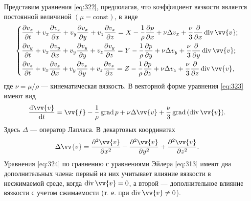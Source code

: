 	Представим уравнения \eqref{eq:322}, предполагая, что коэффициент вязкости является постоянной величиной $\left(\mu = \mathrm{const}\right)$, в виде
	\begin{gather}
		\begin{dcases}\label{eq:323}
			\begin{aligned}
				\frac{\pp v_x}{\pp t} + v_x\frac{\pp v_x}{\pp x} + v_y\frac{\pp v_x}{\pp y} + v_z\frac{\pp v_x}{\pp z} = X - \frac{1}{\rho}\frac{\pp p}{\pp x} + \nu\Delta v_x + \frac{\nu}{3}\frac{\pp}{\pp x}\diverg\vv{v};
			\end{aligned}\\
			\begin{aligned}
				\frac{\pp v_y}{\pp t} + v_x\frac{\pp v_y}{\pp x} + v_y\frac{\pp v_y}{\pp y} + v_z\frac{\pp v_y}{\pp z} = Y - \frac{1}{\rho}\frac{\pp p}{\pp y} + \nu\Delta v_y + \frac{\nu}{3}\frac{\pp}{\pp y}\diverg\vv{v};
			\end{aligned}\\
			\begin{aligned}
				\frac{\pp v_z}{\pp t} + v_x\frac{\pp v_z}{\pp x} + v_y\frac{\pp v_z}{\pp y} + v_z\frac{\pp v_z}{\pp z} = Z - \frac{1}{\rho}\frac{\pp p}{\pp z} + \nu\Delta v_z + \frac{\nu}{3}\frac{\pp}{\pp z}\diverg\vv{v},
			\end{aligned}
		\end{dcases}
	\end{gather}
	где $\nu = \mu/\rho$ --- кинематическая вязкость.\n
	В векторной форме уравнения \eqref{eq:323} имеют вид
	\begin{gather}
		\frac{\dd\vv{v}}{\dd t} = \vv{f} - \frac{1}{\rho}\grad{p} + \nu\Delta\vv{v} + \frac{\nu}{3}\grad{\left(\diverg\vv{v}\right)}.\label{eq:324}
	\end{gather}\n
	Здесь $\Delta$ --- оператор Лапласа.\n
	В декартовых координатах
	\begin{gather*}
		\Delta\vv{v} = \frac{\pp^2\vv{v}}{\pp x^2} + \frac{\pp^2\vv{v}}{\pp y^2} + \frac{\pp^2\vv{v}}{\pp z^2}.
	\end{gather*}\n
	Уравнения \eqref{eq:324} по сравнению с уравнениями Эйлера \eqref{eq:313} имеют два дополнительных члена: первый из них учитывает влияние вязкости в несжимаемой среде, когда $\diverg\vv{v} = 0$, а второй --- дополнительное влияние вязкости с учетом сжимаемости (т. е. при $\diverg\vv{v} \ne 0$).
	
